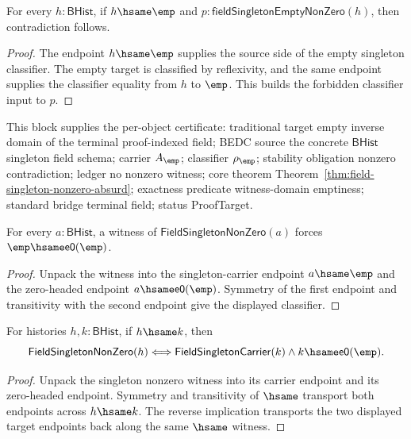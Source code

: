 \begin{theorem}
\label{thm:field-singleton-nonzero-empty-endpoint-absurd}
For every $h:\mathsf{BHist}$, if $h\hsame\emp$ and
$p:\mathsf{fieldSingletonEmptyNonZero}(h)$, then contradiction follows.
\end{theorem}
\begin{proof}
The endpoint $h\hsame\emp$ supplies the source side of the empty singleton
classifier. The empty target is classified by reflexivity, and the same
endpoint supplies the classifier equality from $h$ to $\emp$. This builds the
forbidden classifier input to $p$.
\end{proof}

This block supplies the per-object certificate: traditional target empty
inverse domain of the terminal proof-indexed field; BEDC source the concrete
$\mathsf{BHist}$ singleton field schema; carrier $A_{\emp}$; classifier
$\rho_{\emp}$; stability obligation nonzero contradiction; ledger no nonzero
witness; core theorem Theorem~\ref{thm:field-singleton-nonzero-absurd};
exactness predicate witness-domain emptiness; standard bridge terminal field;
status ProofTarget.

\begin{theorem}
\label{thm:field-singleton-nonzero-empty-e0-forced}
For every $a:\mathsf{BHist}$, a witness of
$\mathsf{FieldSingletonNonZero}(a)$ forces
$\emp\hsame\mathsf{e0}(\emp)$.
\end{theorem}
\begin{proof}
Unpack the witness into the singleton-carrier endpoint $a\hsame\emp$ and the
zero-headed endpoint $a\hsame\mathsf{e0}(\emp)$. Symmetry of the first endpoint
and transitivity with the second endpoint give the displayed classifier.
\end{proof}

\begin{theorem}
\label{thm:field-singleton-nonzero-hsame-target-readback}
For histories $h,k:\mathsf{BHist}$, if $h\hsame k$, then
$$
\mathsf{FieldSingletonNonZero}(h)
\Longleftrightarrow
\mathsf{FieldSingletonCarrier}(k)\land
k\hsame\mathsf{e0}(\emp).
$$
\end{theorem}
\begin{proof}
Unpack the singleton nonzero witness into its carrier endpoint and its
zero-headed endpoint. Symmetry and transitivity of $\hsame$ transport both
endpoints across $h\hsame k$. The reverse implication transports the two
displayed target endpoints back along the same $\hsame$ witness.
\end{proof}
